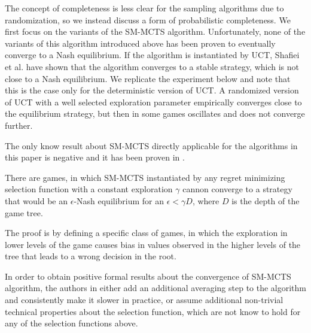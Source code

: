 {The concept of completeness is less clear for the sampling algorithms due to randomization, so we instead discuss a form of probabilistic completeness. 
We first focus on the variants of the SM-MCTS algorithm.
Unfortunately, none of the variants of this algorithm introduced above has been proven to eventually converge to a Nash equilibrium. If the algorithm is instantiated by UCT, Shafiei et al. \cite{Shafiei09} have shown that the algorithm converges to a stable strategy, which is not close to a Nash equilibrium. We replicate the experiment below and note that this is the case only for the deterministic version of UCT. A randomized version of UCT with a well selected exploration parameter empirically converges close to the equilibrium strategy, but then in some games oscillates and does not converge further.

The only know result about SM-MCTS directly applicable for the algorithms in this paper is negative and it has been proven in \cite{Kovarik2015Analysis}.

\begin{theorem}
There are games, in which SM-MCTS instantiated by any regret minimizing selection function with a constant exploration $\gamma$ cannon converge to a strategy that would be an $\epsilon$-Nash equilibrium for an $\epsilon < \gamma D$, where $D$ is the depth of the game tree.
\end{theorem}

The proof is by defining a specific class of games, in which the exploration in lower levels of the game causes bias in values observed in the higher levels of the tree that leads to a wrong decision in the root.

In order to obtain positive formal results about the convergence of SM-MCTS algorithm, the authors in \cite{Kovarik2015Analysis} either add an additional averaging step to the algorithm and consistently make it  slower in practice, or assume additional non-trivial technical properties about the selection function, which are not know to hold for any of the selection functions above. %


}
